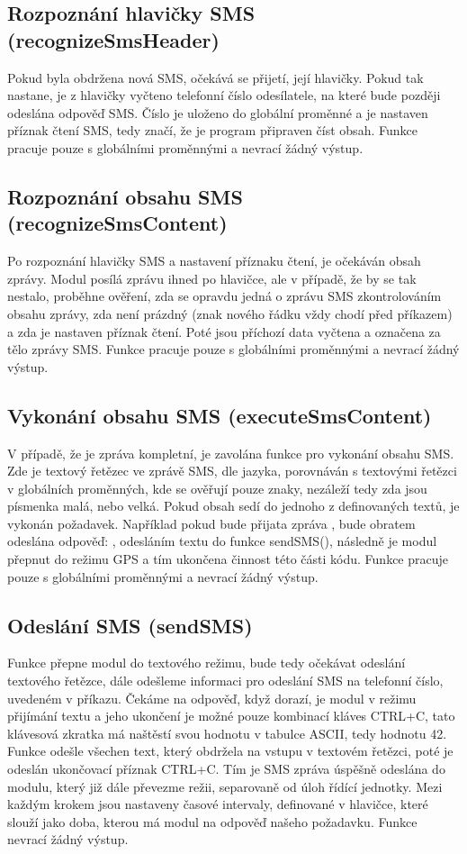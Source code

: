 \documentclass[FM,MP]{tulthesis}  %
\begin{document}
\subsection{Rozpoznání hlavičky SMS (recognizeSmsHeader)}
Pokud byla obdržena nová SMS, očekává se přijetí, její hlavičky. Pokud tak nastane, je z hlavičky vyčteno telefonní číslo odesílatele, na které bude později odeslána odpověď SMS. Číslo je uloženo do globální proměnné a je nastaven příznak čtení SMS, tedy značí, že je program připraven číst obsah. Funkce pracuje pouze s globálními proměnnými a nevrací žádný výstup.

\subsection{Rozpoznání obsahu SMS (recognizeSmsContent)}
Po rozpoznání hlavičky SMS a nastavení příznaku čtení, je očekáván obsah zprávy. Modul posílá zprávu ihned po hlavičce, ale v případě, že by se tak nestalo, proběhne ověření, zda se opravdu jedná o zprávu SMS zkontrolováním obsahu zprávy, zda není prázdný (znak nového řádku vždy chodí před příkazem) a zda je nastaven příznak čtení. Poté jsou příchozí data vyčtena a označena za tělo zprávy SMS. Funkce pracuje pouze s globálními proměnnými a nevrací žádný výstup.

\subsection{Vykonání obsahu SMS (executeSmsContent)}
V případě, že je zpráva kompletní, je zavolána funkce pro vykonání obsahu SMS. Zde je textový řetězec ve zprávě SMS, dle jazyka, porovnáván s textovými řetězci v globálních proměnných, kde se ověřují pouze znaky, nezáleží tedy zda jsou písmenka malá, nebo velká. Pokud obsah sedí do jednoho z definovaných textů, je vykonán požadavek. Například pokud bude přijata zpráva , bude obratem odeslána odpověď: , odesláním textu do funkce sendSMS(), následně je modul přepnut do režimu GPS a tím ukončena činnost této části kódu. Funkce pracuje pouze s globálními proměnnými a nevrací žádný výstup.

\subsection{Odeslání SMS (sendSMS)}
Funkce přepne modul do textového režimu, bude tedy očekávat odeslání textového řetězce, dále odešleme informaci pro odeslání SMS na telefonní číslo, uvedeném v příkazu. Čekáme na odpověď, když dorazí, je modul v režimu přijímání textu a jeho ukončení je možné pouze kombinací kláves CTRL+C, tato klávesová zkratka má naštěstí svou hodnotu v tabulce ASCII, tedy hodnotu 42. Funkce odešle všechen text, který obdržela na vstupu v textovém řetězci, poté je odeslán ukončovací příznak CTRL+C. Tím je SMS zpráva úspěšně odeslána do modulu, který již dále převezme režii, separovaně od úloh řídící jednotky. Mezi každým krokem jsou nastaveny časové intervaly, definované v hlavičce, které slouží jako doba, kterou má modul na odpověď našeho požadavku. Funkce nevrací žádný výstup.
\end{document}
